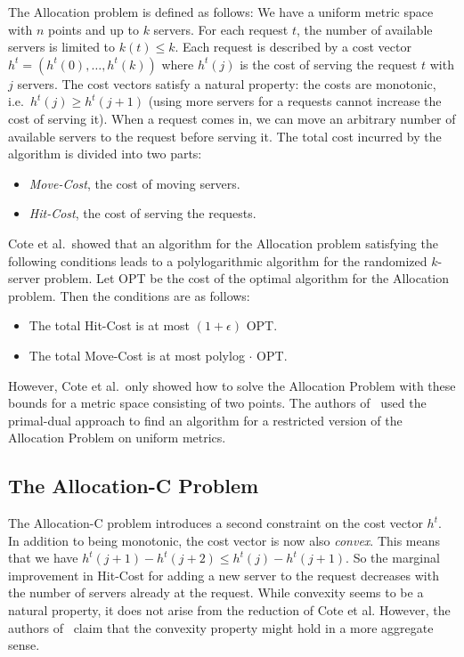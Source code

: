 The Allocation problem is defined as follows:
We have a uniform metric space with $n$ points and up to $k$ servers.
For each request $t$, the number of available servers is limited to $k(t) \leq k$.
Each request is described by a cost vector $h^t = (h^t(0), \ldots, h^t(k))$ where $h^t(j)$ is the cost of serving the request $t$ with $j$ servers.
The cost vectors satisfy a natural property: the costs are monotonic, i.e.\ $h^t(j) \geq h^t(j + 1)$ (using more servers for a requests cannot increase the cost of serving it).
When a request comes in, we can move an arbitrary number of available servers to the request before serving it.
The total cost incurred by the algorithm is divided into two parts:
\begin{itemize}
\item \emph{Move-Cost}, the cost of moving servers.
\item \emph{Hit-Cost}, the cost of serving the requests.
\end{itemize}

Cote et al.\ showed that an algorithm for the Allocation problem satisfying the following conditions leads to a polylogarithmic algorithm for the randomized $k$-server problem.
Let OPT be the cost of the optimal algorithm for the Allocation problem.
Then the conditions are as follows:
\begin{itemize}
\item The total Hit-Cost is at most $(1 + \epsilon)$ OPT.
\item The total Move-Cost is at most polylog $\cdot$ OPT.
\end{itemize}
However, Cote et al.\ only showed how to solve the Allocation Problem with these bounds for a metric space consisting of two points.
The authors of~\cite{bansal10:k-server} used the primal-dual approach to find an algorithm for a restricted version of the Allocation Problem on uniform metrics.

\subsection{The Allocation-C Problem}
The Allocation-C problem introduces a second constraint on the cost vector $h^t$.
In addition to being monotonic, the cost vector is now also \emph{convex}.
This means that we have $h^t(j+1) - h^t(j +2) \leq h^t(j) - h^t(j + 1)$.
So the marginal improvement in Hit-Cost for adding a new server to the request decreases with the number of servers already at the request.
While convexity seems to be a natural property, it does not arise from the reduction of Cote et al.
However, the authors of~\cite{bansal10:k-server} claim that the convexity property might hold in a more aggregate sense.

